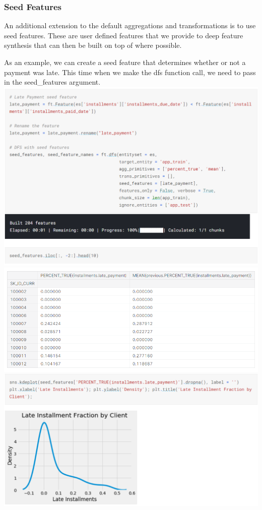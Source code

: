 \documentclass[twoside,a4paper]{article}
\begin{document}
\subsubsection{Seed Features}
An additional extension to the default aggregations and transformations is to use seed features. These are user defined features that we provide to deep feature synthesis that can then be built on top of where possible.

As an example, we can create a seed feature that determines whether or not a payment was late. This time when we make the dfs function call, we need to pass in the seed\_features argument.\\
\includegraphics[scale=.7]{26.png}\\
\includegraphics[scale=.8]{27.png}\\
\includegraphics[scale=.7]{28.png}\\
\end{document}
